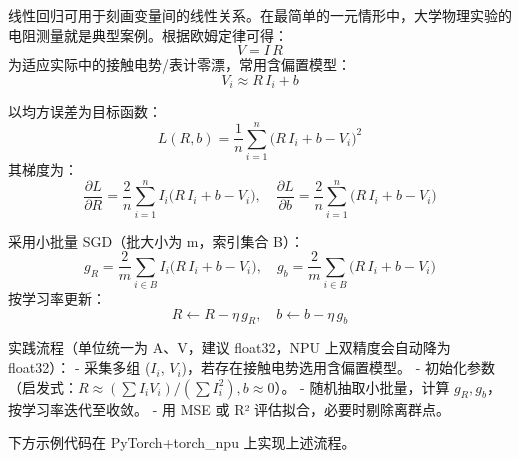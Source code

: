 线性回归可用于刻画变量间的线性关系。在最简单的一元情形中，大学物理实验的电阻测量就是典型案例。根据欧姆定律可得：
\[V = I\,R\] 为适应实际中的接触电势/表计零漂，常用含偏置模型：
\[V_i \approx R\,I_i + b\]

以均方误差为目标函数： \[
L(R,b)=\frac{1}{n}\sum_{i=1}^{n}\big(R\,I_i+b-V_i\big)^2
\] 其梯度为： \[
\frac{\partial L}{\partial R}=\frac{2}{n}\sum_{i=1}^{n}I_i\big(R\,I_i+b-V_i\big),\quad
\frac{\partial L}{\partial b}=\frac{2}{n}\sum_{i=1}^{n}\big(R\,I_i+b-V_i\big)
\]

采用小批量 SGD（批大小为 m，索引集合 B）： \[
g_R=\frac{2}{m}\sum_{i\in B}I_i\big(R\,I_i+b-V_i\big),\quad
g_b=\frac{2}{m}\sum_{i\in B}\big(R\,I_i+b-V_i\big)
\] 按学习率更新： \[
R\leftarrow R-\eta\,g_R,\quad b\leftarrow b-\eta\,g_b
\]

实践流程（单位统一为 A、V，建议 float32，NPU 上双精度会自动降为
float32）： - 采集多组 (\(I_i\),
\(V_i\))，若存在接触电势选用含偏置模型。 -
初始化参数（启发式：\(R \approx (\sum I_i V_i)/(\sum I_i^2), b \approx 0\)）。
- 随机抽取小批量，计算 \(g_R, g_b\)，按学习率迭代至收敛。 - 用 MSE 或 R²
评估拟合，必要时剔除离群点。

下方示例代码在 PyTorch+torch\_npu 上实现上述流程。

